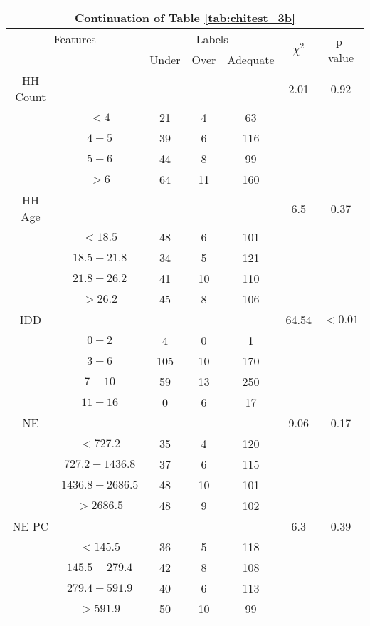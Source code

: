 \begin{table}
\centering
\label{tab:chitest_3b_cont}
\begin{tabular}{c c | c c c| c | c}
\hline
\multicolumn{7}{c}{Continuation of Table \ref{tab:chitest_3b}}\\ 
\hline
\multicolumn{2}{c|}{Features}& \multicolumn{3}{c|}{Labels}& \multirow{2}{*}{$\chi^2$} & \multirow{2}{*}{p-value}\\ 
& & Under & Over & Adequate & & \\ 
\hline
HH Count &  &  &  & & 2.01 & 0.92 \\ 
& $< 4$ & 21 & 4 & 63& & \\ 
& $4-5$ & 39 & 6 & 116& & \\ 
& $5-6$ & 44 & 8 & 99& & \\ 
& $> 6$ & 64 & 11 & 160& & \\ 
\hline 
HH Age &  &  &  & & 6.5 & 0.37 \\ 
& $< 18.5$ & 48 & 6 & 101& & \\ 
& $18.5-21.8$ & 34 & 5 & 121& & \\ 
& $21.8-26.2$ & 41 & 10 & 110& & \\ 
& $> 26.2$ & 45 & 8 & 106& & \\ 
\hline 
IDD &  &  &  & & 64.54 & $< 0.01$ \\ 
& $0-2$ & 4 & 0 & 1& & \\ 
& $3-6$ & 105 & 10 & 170& & \\ 
& $7-10$ & 59 & 13 & 250& & \\ 
& $11-16$ & 0 & 6 & 17& & \\ 
\hline 
NE &  &  &  & & 9.06 & 0.17 \\ 
& $< 727.2$ & 35 & 4 & 120& & \\ 
& $727.2-1436.8$ & 37 & 6 & 115& & \\ 
& $1436.8-2686.5$ & 48 & 10 & 101& & \\ 
& $> 2686.5$ & 48 & 9 & 102& & \\ 
\hline 
NE PC &  &  &  & & 6.3 & 0.39 \\ 
& $< 145.5$ & 36 & 5 & 118& & \\ 
& $145.5-279.4$ & 42 & 8 & 108& & \\ 
& $279.4-591.9$ & 40 & 6 & 113& & \\ 
& $> 591.9$ & 50 & 10 & 99& & \\ 
\hline 
\end{tabular}
\end{table}

